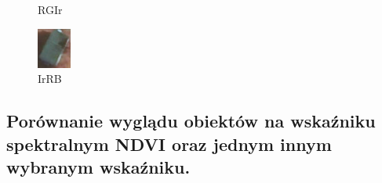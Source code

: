 \documentclass[a4paper,12pt]{article}  %
\begin{document}
\begin{figure}[H]
\begin{minipage}{0.24\textwidth}
        \caption*{RGIr}
    \end{minipage}
    \begin{minipage}{0.24\textwidth}
        \centering
        \includegraphics[width=\linewidth]{spektralne/irrb_budynek3.png}
        \caption*{IrRB}
    \end{minipage}
\end{figure}


\subsection{Porównanie wyglądu obiektów na wskaźniku spektralnym NDVI oraz jednym innym wybranym wskaźniku.}
\end{document}
